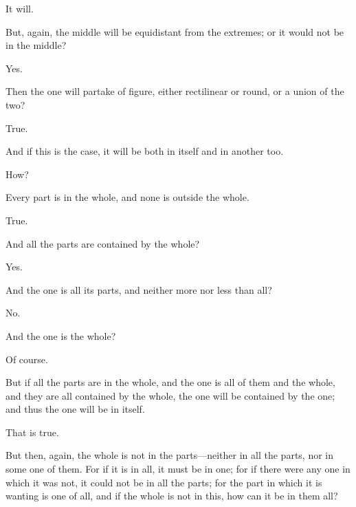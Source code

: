\documentclass[11pt,letter]{article}
\begin{document}
\par  It will.

\par  But, again, the middle will be equidistant from the extremes; or it would not be in the middle?

\par  Yes.

\par  Then the one will partake of figure, either rectilinear or round, or a union of the two?

\par  True.

\par  And if this is the case, it will be both in itself and in another too.

\par  How?

\par  Every part is in the whole, and none is outside the whole.

\par  True.

\par  And all the parts are contained by the whole?

\par  Yes.

\par  And the one is all its parts, and neither more nor less than all?

\par  No.

\par  And the one is the whole?

\par  Of course.

\par  But if all the parts are in the whole, and the one is all of them and the whole, and they are all contained by the whole, the one will be contained by the one; and thus the one will be in itself.

\par  That is true.

\par  But then, again, the whole is not in the parts—neither in all the parts, nor in some one of them. For if it is in all, it must be in one; for if there were any one in which it was not, it could not be in all the parts; for the part in which it is wanting is one of all, and if the whole is not in this, how can it be in them all?
\end{document}
